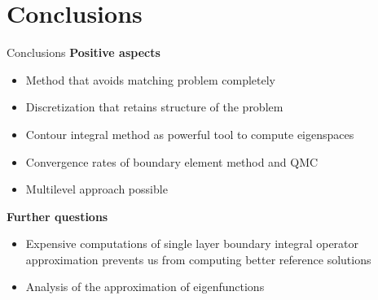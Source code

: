 \section{Conclusions}

\begin{frame}{Conclusions}
    \textbf{Positive aspects}
    \begin{itemize}
        \item Method that avoids matching problem completely
        \item Discretization that retains structure of the problem
        \item Contour integral method as powerful tool to compute eigenspaces
        \item Convergence rates of boundary element method and QMC
        \item Multilevel approach possible
    \end{itemize}
    \vspace{5mm}
    \textbf{Further questions}
    \begin{itemize}
        \item Expensive computations of single layer boundary integral operator approximation prevents us from computing better reference solutions
        \item Analysis of the approximation of eigenfunctions
    \end{itemize}
\end{frame}